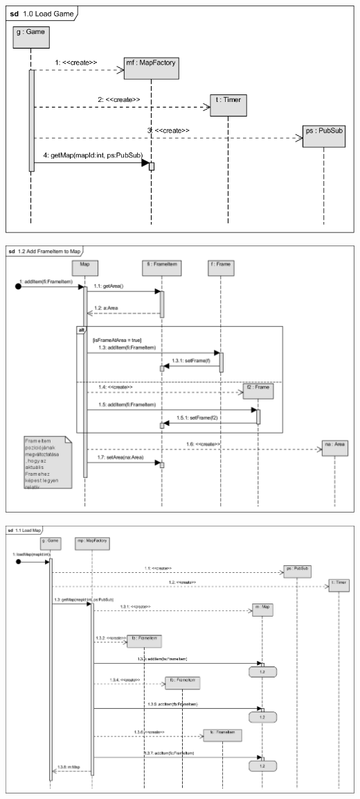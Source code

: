 		\begin{center}\includegraphics[scale=1]{resources/10LoadGame.png}\end{center}
		\begin{center}\includegraphics[scale=0.75]{resources/12AddFrameItemtoMap.png}\end{center}
		\begin{center}\includegraphics[scale=0.8, angle=-90]{resources/11LoadMap.png}\end{center}

